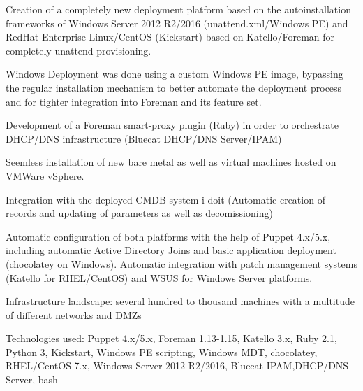 \begin{cventries}
    {}
    {}
    {
      \begin{cvitems}
      \item Creation of a completely new deployment platform based on the autoinstallation
        frameworks of Windows Server 2012 R2/2016 (unattend.xml/Windows PE) and RedHat Enterprise
        Linux/CentOS (Kickstart) based on Katello/Foreman for completely unattend provisioning.
      \item Windows Deployment was done using a custom Windows PE image, bypassing the regular
        installation mechanism to better automate the deployment process and for tighter integration
        into Foreman and its feature set.
      \item Development of a Foreman smart-proxy plugin (Ruby) in order to orchestrate DHCP/DNS infrastructure (Bluecat DHCP/DNS Server/IPAM)
      \item Seemless installation of new bare metal as well as virtual machines hosted on VMWare vSphere.
      \item Integration with the deployed CMDB system i-doit (Automatic creation of records and
        updating of parameters as well as decomissioning)
      \item Automatic configuration of both
        platforms with the help of Puppet 4.x/5.x, including automatic Active Directory Joins and
        basic application deployment (chocolatey on Windows). Automatic integration with patch management
        systems (Katello for RHEL/CentOS) and WSUS for Windows Server platforms.
      \item Infrastructure landscape: several hundred to thousand machines with a multitude of
        different networks and DMZs
      \item Technologies used: Puppet 4.x/5.x, Foreman 1.13-1.15, Katello 3.x, Ruby 2.1, Python 3, Kickstart, Windows PE scripting, Windows
        MDT, chocolatey, RHEL/CentOS 7.x, Windows Server 2012 R2/2016, Bluecat IPAM,DHCP/DNS Server,
        bash
      \end{cvitems}
    }


\end{cventries}
